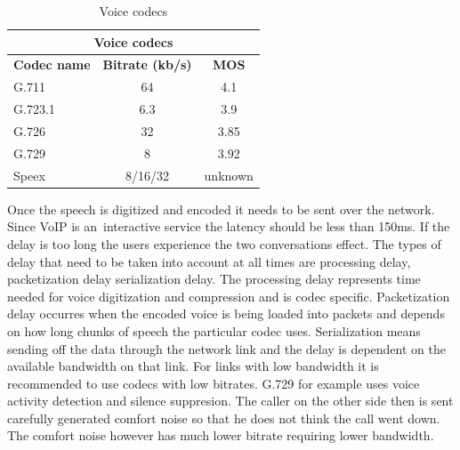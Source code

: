 \begin{table}
\begin{center}
\begin{tabular}{|l|c|c|}
	\hline
	\multicolumn{3}{|c|}{\textbf{Voice codecs}}	\\
	\hline
		\textbf{Codec name} & \textbf{Bitrate (kb/s)} & \textbf{MOS} \\
	\hline
	G.711	& 64 & 4.1 \\
	\hline
	G.723.1 & 6.3 & 3.9 \\
	\hline
	G.726 & 32 & 3.85 \\ 
	\hline
	G.729 & 8  & 3.92 \\ 
	\hline
	Speex	& 8/16/32 & unknown \\
	\hline	
\end{tabular}
\end{center}
\label{tab:voipCodecs}
\caption{Voice codecs\cite{voiceCodecs}}
\end{table}

Once the speech is digitized and encoded it needs to be sent over the network. Since VoIP is an~interactive service the latency should be less than 150ms. If the delay is too long the users experience the two conversations effect. The types of delay that need to be taken into account at all times are processing delay, packetization delay serialization delay. The processing delay represents time needed for voice digitization and compression and is codec specific. Packetization delay occurres when the encoded voice is being loaded into packets and depends on how long chunks of speech the particular codec uses. Serialization means sending off the data through the network link and the delay is dependent on the available bandwidth on that link. For links with low bandwidth it is recommended to use codecs with low bitrates. G.729 for example uses voice activity detection and silence suppresion. The caller on the other side then is sent carefully generated comfort noise so that he does not think the call went down. The comfort noise however has much lower bitrate requiring lower bandwidth.

